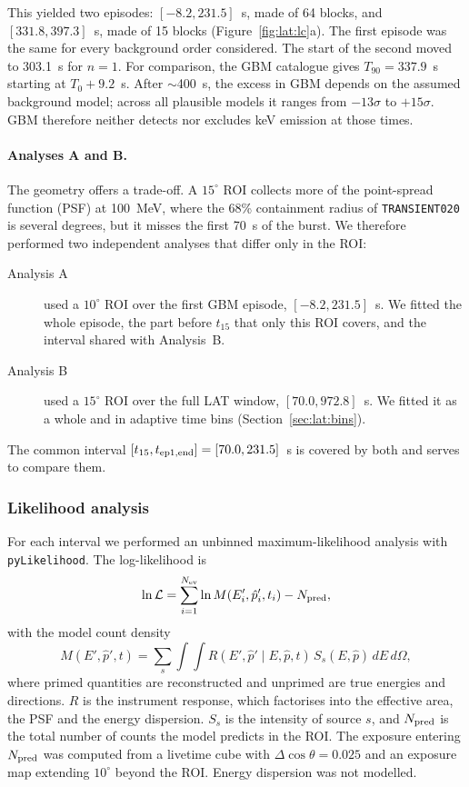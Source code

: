 This yielded two episodes: $[-8.2, 231.5]$~s, made of 64 blocks, and $[331.8, 397.3]$~s, made of 15 blocks
(Figure~\ref{fig:lat:lc}a). The first episode was the same for every background order considered. The start of the
second moved to 303.1~s for $n = 1$. For comparison, the GBM catalogue gives $T_{90} = 337.9$~s starting at $T_0+9.2$~s.
After $\sim$400~s, the excess in GBM depends on the assumed background model; across all plausible models it ranges
from $-13\sigma$ to $+15\sigma$. GBM therefore neither detects nor excludes keV emission at those times.

\paragraph{Analyses A and B.}
The geometry offers a trade-off. A $15^\circ$ ROI collects more of the point-spread function (PSF) at
100~MeV, where the 68\% containment radius of \texttt{TRANSIENT020} is several degrees, but it misses the first
70~s of the burst. We therefore performed two independent analyses that differ only in the ROI:
\begin{description}
  \item[Analysis A] used a $10^\circ$ ROI over the first GBM episode, $[-8.2, 231.5]$~s. We fitted the whole episode,
    the part before $t_{15}$ that only this ROI covers, and the interval shared with Analysis~B.
  \item[Analysis B] used a $15^\circ$ ROI over the full LAT window, $[70.0, 972.8]$~s. We fitted it as a whole and
    in adaptive time bins (Section~\ref{sec:lat:bins}).
\end{description}
The common interval $[t_{15}, t_{\rm ep1,end}] = [70.0, 231.5]$~s is covered by both and serves to compare them.

\subsubsection{Likelihood analysis}
\label{sec:lat:like}

For each interval we performed an unbinned maximum-likelihood analysis \citep{Mattox1996} with
\texttt{pyLikelihood}. The log-likelihood is
\begin{equation}
  \ln\mathcal{L} = \sum_{i=1}^{N_{\rm ev}} \ln M(E'_i, \hat{p}'_i, t_i) - N_{\rm pred},
  \label{eq:like}
\end{equation}
with the model count density
\begin{equation}
  M(E', \hat{p}', t) = \sum_s \int\!\!\int R(E', \hat{p}' \mid E, \hat{p}, t)\, S_s(E, \hat{p})\, dE\, d\Omega,
  \label{eq:model}
\end{equation}
where primed quantities are reconstructed and unprimed are true energies and directions. $R$ is the instrument
response, which factorises into the effective area, the PSF and the energy dispersion. $S_s$ is the intensity of
source $s$, and $N_{\rm pred}$ is the total number of counts the model predicts in the ROI. The exposure entering
$N_{\rm pred}$ was computed from a livetime cube with $\Delta\cos\theta = 0.025$ and an exposure map extending
$10^\circ$ beyond the ROI. Energy dispersion was not modelled.

